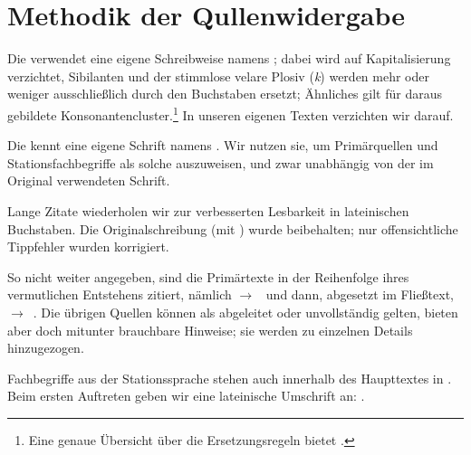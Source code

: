 \section*{Methodik der Qullenwidergabe}

Die  verwendet eine eigene Schreibweise namens  ; dabei wird auf Kapitalisierung verzichtet,  Sibilanten und der stimmlose velare Plosiv (\emph{k}) werden mehr oder weniger ausschließlich durch den Buchstaben  ersetzt; Ähnliches gilt für daraus gebildete  Konsonantencluster.\footnote{Eine genaue Übersicht über die Ersetzungsregeln bietet \cite[S.~46]{cbasebook}.} In unseren eigenen Texten verzichten wir darauf.

Die  kennt eine eigene Schrift namens . Wir nutzen sie, um Primärquellen und Stationsfachbegriffe als solche auszuweisen, und zwar unabhängig von der im Original verwendeten Schrift. 

Lange Zitate wiederholen wir zur verbesserten Lesbarkeit in lateinischen Buchstaben. Die Originalschreibung (mit ) wurde beibehalten; nur offensichtliche Tippfehler wurden korrigiert. 

So nicht weiter angegeben, sind die Primärtexte in der Reihenfolge ihres vermutlichen Entstehens zitiert, nämlich \cite{cbasewebsite} $\rightarrow$~\cite{cbasestarbasemanual} und dann, abgesetzt im Fließtext, $\rightarrow$~\cite{cbasebook}. Die übrigen Quellen können als abgeleitet oder unvollständig gelten, bieten aber doch mitunter brauchbare Hinweise; sie werden zu einzelnen Details hinzugezogen.
 
Fachbegriffe aus der Stationssprache stehen auch innerhalb des Haupttextes in . Beim ersten Auftreten geben wir eine lateinische Umschrift an: .





